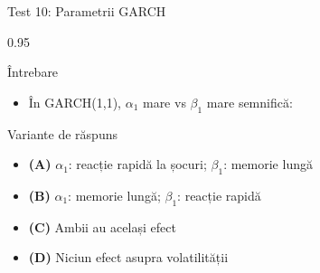 \documentclass[9pt, aspectratio=169, t]{beamer}
\begin{document}
\begin{frame}{Test 10: Parametrii GARCH}
    \begin{cminipage}{0.95\textwidth}
    \begin{alertblock}{Întrebare}
        \begin{itemize}\setlength{\itemsep}{0pt}
            \item În GARCH(1,1), $\alpha_1$ mare vs $\beta_1$ mare semnifică:
        \end{itemize}
    \end{alertblock}

    \begin{block}{Variante de răspuns}
    \begin{itemize}\setlength{\itemsep}{0pt}
        \item \textcolor{MainBlue}{\textbf{(A)}} $\alpha_1$: reacție rapidă la șocuri; $\beta_1$: memorie lungă
        \item \textcolor{MainBlue}{\textbf{(B)}} $\alpha_1$: memorie lungă; $\beta_1$: reacție rapidă
        \item \textcolor{MainBlue}{\textbf{(C)}} Ambii au același efect
        \item \textcolor{MainBlue}{\textbf{(D)}} Niciun efect asupra volatilității
    \end{itemize}
    \end{block}
    \end{cminipage}
\end{frame}
\end{document}
